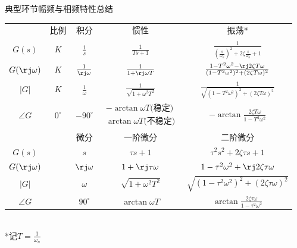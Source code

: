 \documentclass[handout,cjkutf8,table,aspectratio=1610]{beamer} %
\begin{document}
\begin{frame}{典型环节幅频与相频特性总结}
	\centering
	\begin{tabular}{ccccc}
		\toprule
				&比例	&积分			&惯性						&振荡*\\%
		$G(s)$	&$K$		&$\frac{1}{s}$		&$\frac{1}{Ts+1}$				&$\frac{1}{(\frac{s}{\omega_n})^2+2\zeta\frac{s}{\omega_n}+1}$\\
		$G(\rj\omega)$&$K$&$\frac{1}{\rj\omega}$&$\frac{1}{1+\rj\omega T}$		&$\frac{1-T^2\omega^2-\rj 2\zeta T\omega}{(1-T^2\omega^2)^2+(2\zeta T\omega)^2}$\\
		$|G|$		&$K$	&$\frac{1}{\omega}$	&$\frac{1}{\sqrt{1+\omega^2T^2}}$	&$\frac{1}{\sqrt{(1-T^2\omega^2)^2+(2\zeta T\omega)^2}}$\\
		$\angle G$&$0^\circ$	&$-90^\circ$	&$\begin{array}{c}-\arctan\omega T\text{(稳定)}\\	\arctan\omega T\text{(不稳定)}\end{array}$	&$-\arctan\frac{2\zeta T\omega}{1-T^2\omega^2}$\\
		\toprule
				&		&微分			&一阶微分					&二阶微分	\\
		$G(s)$	&		&$s$			&$\tau s + 1$				&$\tau^2s^2+2\zeta\tau s +1$\\
		$G(\rj\omega)$&	&$\rj\omega$		&$1+\rj\tau\omega$		&$1-\tau^2\omega^2+\rj 2\zeta\tau\omega$\\
		$|G|$		&		&$\omega$		&$\sqrt{1+\omega^2T^2}$	&$\sqrt{(1-\tau^2\omega^2)^2+(2\zeta\tau\omega)^2}$\\
		$\angle G$&		&$90^\circ$		&$\arctan\omega T$		&$\arctan\frac{2\zeta\tau\omega}{1-\tau^2\omega^2}$\\
		\bottomrule
	\end{tabular}\\
	*记$T = \frac{1}{\omega_n}$
\end{frame}
\end{document}
